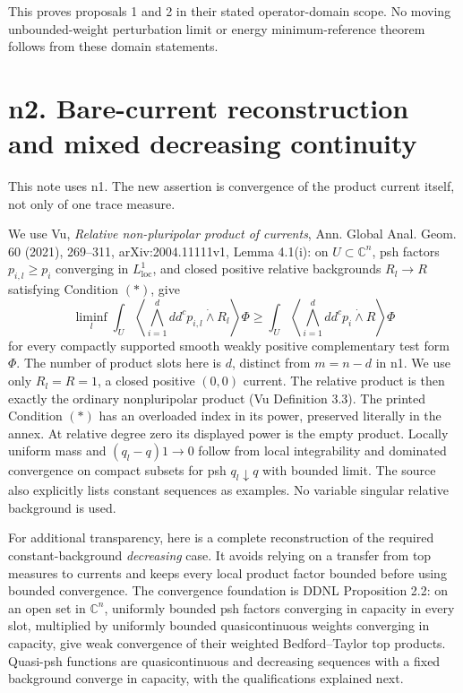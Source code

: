 \documentclass[
  11pt,
]{article}
\begin{document}
This proves proposals 1 and 2 in their stated operator-domain scope. No
moving unbounded-weight perturbation limit or energy minimum-reference
theorem follows from these domain statements.

\section{n2. Bare-current reconstruction and mixed decreasing
continuity}\label{n2.-bare-current-reconstruction-and-mixed-decreasing-continuity}

This note uses n1. The new assertion is convergence of the product
current itself, not only of one trace measure.

We use Vu, \emph{Relative non-pluripolar product of currents}, Ann.
Global Anal. Geom. 60 (2021), 269--311, arXiv:2004.11111v1, Lemma
4.1(i): on \(U\subset\mathbb C^n\), psh factors \(p_{i,l}\geq p_i\)
converging in \(L^1_{\mathrm{loc}}\), and closed positive relative
backgrounds \(R_l\to R\) satisfying Condition \((*)\), give \[
\liminf_l\int_U\left\langle\bigwedge_{i=1}^d dd^cp_{i,l}\mathbin{\dot\wedge}R_l\right\rangle\Phi
\geq\int_U\left\langle\bigwedge_{i=1}^d dd^cp_i\mathbin{\dot\wedge}R\right\rangle\Phi
\] for every compactly supported smooth weakly positive complementary
test form \(\Phi\). The number of product slots here is \(d\), distinct
from \(m=n-d\) in n1. We use only \(R_l=R=1\), a closed positive
\((0,0)\) current. The relative product is then exactly the ordinary
nonpluripolar product (Vu Definition 3.3). The printed Condition \((*)\) has
an overloaded index in its power, preserved literally in the annex. At
relative degree zero its displayed power is the empty product. Locally
uniform mass and \((q_l-q)1\to0\) follow from local integrability and
dominated convergence on compact subsets for psh \(q_l\downarrow q\)
with bounded limit. The source also explicitly lists constant sequences
as examples. No variable singular relative background is used.

For additional transparency, here is a complete reconstruction of the
required constant-background \emph{decreasing} case. It avoids relying
on a transfer from top measures to currents and keeps every local
product factor bounded before using bounded convergence. The convergence
foundation is DDNL Proposition 2.2: on an open set in \(\mathbb C^n\),
uniformly bounded psh factors converging in capacity in every slot,
multiplied by uniformly bounded quasicontinuous weights converging in
capacity, give weak convergence of their weighted Bedford--Taylor top
products. Quasi-psh functions are quasicontinuous and decreasing
sequences with a fixed background converge in capacity, with the
qualifications explained next.
\end{document}
